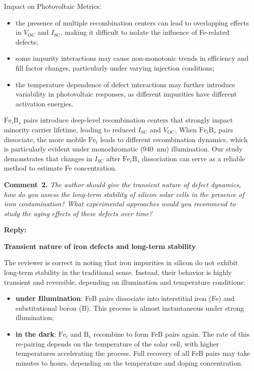 \documentclass[a4paper,fleqn]{cas-sc}
\begin{document}
Impact on Photovoltaic Metrics:
\begin{itemize}
    \item the presence of multiple recombination centers can lead to overlapping effects in $V_\mathrm{OC}$ and $I_\mathrm{SC}$, making it difficult to isolate the influence of Fe-related defects;
    \item some impurity interactions may cause non-monotonic trends in efficiency and fill factor changes, particularly under varying injection conditions;
    \item the temperature dependence of defect interactions may further introduce variability in photovoltaic responses, as different impurities have different activation energies.
\end{itemize}


$\mathrm{Fe}_i\mathrm{B}_s$ pairs introduce deep-level recombination centers that strongly impact minority carrier lifetime, leading to reduced $I_\mathrm{SC}$ and $V_\mathrm{OC}$. When $\mathrm{Fe}_i\mathrm{B}_s$ pairs dissociate, the more mobile $\mathrm{Fe}_i$ leads to different recombination dynamics, which is particularly evident under monochromatic (940~nm) illumination. Our study demonstrates that changes in $I_\mathrm{SC}$ after $\mathrm{Fe}_i\mathrm{B}_s$ dissociation can serve as a reliable method to estimate Fe concentration. 

\vspace{1cm}
\noindent
\textcolor[rgb]{0.00,0.50,1.00}{\textbf{Comment~2.}}
\emph{ The author should give the transient nature of defect dynamics, how do you assess the long-term stability of silicon solar cells in the presence of iron contamination? What experimental approaches would you recommend to study the aging effects of these defects over time?}

\noindent
\textcolor[rgb]{0.51,0.00,0.00}{\textbf{Reply:}}

\textbf{Transient nature of iron defects and long-term stability}

The reviewer is correct in noting that iron impurities in silicon do not exhibit long-term stability in the traditional sense. Instead, their behavior is highly transient and reversible, depending on illumination and temperature conditions:

\begin{itemize}
    \item \textbf{under Illumination}: FeB pairs dissociate into interstitial iron (Fe) and substitutional boron (B). This process is almost instantaneous under strong illumination;
    \item \textbf{in the dark}: $\mathrm{Fe}_i$ and $\mathrm{B}_s$ recombine to form FeB pairs again. The rate of this re-pairing depends on the temperature of the solar cell, with higher temperatures accelerating the process. Full recovery of all FeB pairs may take minutes to hours, depending on the temperature and doping concentration.
\end{itemize}
\end{document}
